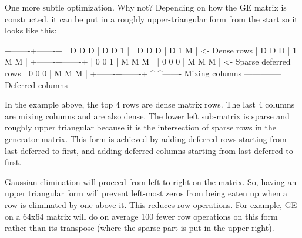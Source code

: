 One more subtle optimization. Why not? Depending on how the GE matrix is constructed, it can be put in a roughly upper-\/triangular form from the start so it looks like this\+: \begin{DoxyVerb}+-------+-------+
| D D D | D D 1 |
| D D D | D 1 M | <- Dense rows
| D D D | 1 M M |
+-------+-------+
| 0 0 1 | M M M |
| 0 0 0 | M M M | <- Sparse deferred rows
| 0 0 0 | M M M |
+-------+-------+
    ^       ^------- Mixing columns
    \--------------- Deferred columns
\end{DoxyVerb}


In the example above, the top 4 rows are dense matrix rows. The last 4 columns are mixing columns and are also dense. The lower left sub-\/matrix is sparse and roughly upper triangular because it is the intersection of sparse rows in the generator matrix. This form is achieved by adding deferred rows starting from last deferred to first, and adding deferred columns starting from last deferred to first.

Gaussian elimination will proceed from left to right on the matrix. So, having an upper triangular form will prevent left-\/most zeros from being eaten up when a row is eliminated by one above it. This reduces row operations. For example, GE on a 64x64 matrix will do on average 100 fewer row operations on this form rather than its transpose (where the sparse part is put in the upper right). 